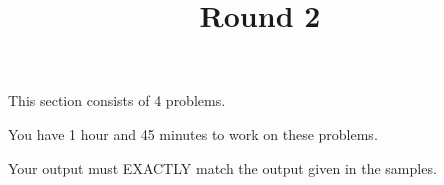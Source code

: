 \documentclass{../codeproblem}
\begin{document}
\title{Round 2}
This section consists of 4 problems.

You have 1 hour and 45 minutes to work on these problems.

Your output must EXACTLY match the output given in the samples.






\end{document}
